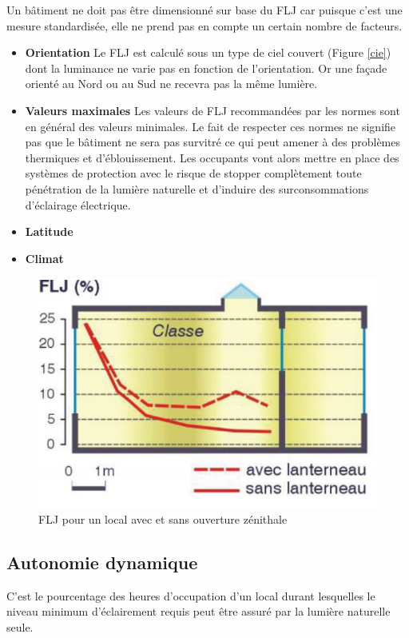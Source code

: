 \documentclass[11pt]{report}
\begin{document}
\vspace{1cm}
Un bâtiment ne doit pas être dimensionné sur base du FLJ car puisque c'est une mesure standardisée, elle ne prend pas en compte un certain nombre de facteurs.
\begin{itemize}



\item \textbf{Orientation}
Le FLJ est calculé sous un type de ciel couvert (Figure \ref{cie}) dont la luminance ne varie pas en fonction de l'orientation. Or une façade orienté au Nord ou au Sud ne recevra pas la même lumière. 
\item \textbf{Valeurs maximales}
Les valeurs de FLJ recommandées par les normes sont en général des valeurs minimales. Le fait de respecter ces normes ne signifie pas que le bâtiment ne sera pas survitré ce qui peut amener à des problèmes thermiques et d'éblouissement. Les occupants vont alors mettre en place des systèmes de protection avec le risque de stopper complètement toute pénétration de la lumière naturelle et d'induire des surconsommations d'éclairage électrique. 
\item \textbf{Latitude}
\item \textbf{Climat}
\end{itemize}

\begin{figure}[h]
\centering
\includegraphics[scale=0.5]{flj1}
\caption{FLJ pour un local avec et sans ouverture zénithale}
\end{figure}


\newpage
\subsection{Autonomie dynamique}
C'est le pourcentage des heures d'occupation d'un local durant lesquelles le niveau minimum d'éclairement requis peut être assuré par la lumière naturelle seule.
\end{document}
